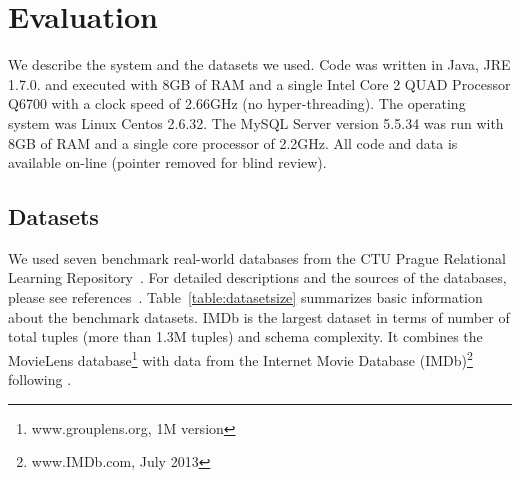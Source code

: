 \documentclass[letterpaper]{article}
\begin{document}





\section{Evaluation} 


We describe the system and the datasets we used.
Code was written in Java, JRE 1.7.0.  and executed with 8GB of RAM and a single Intel Core 2 QUAD Processor Q6700 with a clock speed of 2.66GHz (no hyper-threading). The operating system was Linux Centos 2.6.32. 
The MySQL Server version 5.5.34 was run with 8GB of RAM and a single core processor of 2.2GHz. 
All code and data is available on-line (pointer removed for blind review).

\subsection{Datasets} 
We used seven benchmark real-world databases from the CTU Prague Relational Learning Repository~\cite{Motl2015a}. For detailed descriptions and  the sources of the databases, please see references~\cite{Schulte2012,Qian2014a}. Table~\ref{table:datasetsize} summarizes basic information about the benchmark datasets.   IMDb is the largest dataset in terms of number of total tuples (more than 1.3M tuples) and schema complexity. %
It combines the MovieLens database\footnote{www.grouplens.org, 1M version} with data from the Internet Movie Database (IMDb)\footnote{www.IMDb.com, July 2013} following \cite{Peralta2007}.
\end{document}
